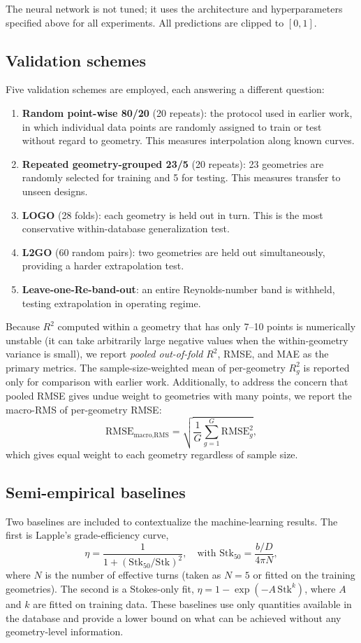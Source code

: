 \documentclass[12pt]{article}
\newcommand{\Stk}{\mathrm{Stk}}
\begin{document}
The neural network is not tuned; it uses the architecture and hyperparameters specified above for all experiments. All predictions are clipped to $[0, 1]$.

\subsection{Validation schemes}
Five validation schemes are employed, each answering a different question:
\begin{enumerate}[label=(\alph*)]
\item \textbf{Random point-wise 80/20} (20 repeats): the protocol used in earlier work, in which individual data points are randomly assigned to train or test without regard to geometry. This measures interpolation along known curves.
\item \textbf{Repeated geometry-grouped 23/5} (20 repeats): 23 geometries are randomly selected for training and 5 for testing. This measures transfer to unseen designs.
\item \textbf{LOGO} (28 folds): each geometry is held out in turn. This is the most conservative within-database generalization test.
\item \textbf{L2GO} (60 random pairs): two geometries are held out simultaneously, providing a harder extrapolation test.
\item \textbf{Leave-one-Re-band-out}: an entire Reynolds-number band is withheld, testing extrapolation in operating regime.
\end{enumerate}
Because $R^2$ computed within a geometry that has only 7--10 points is numerically unstable (it can take arbitrarily large negative values when the within-geometry variance is small), we report \emph{pooled out-of-fold} $R^2$, RMSE, and MAE as the primary metrics. The sample-size-weighted mean of per-geometry $R^2_g$ is reported only for comparison with earlier work. Additionally, to address the concern that pooled RMSE gives undue weight to geometries with many points, we report the macro-RMS of per-geometry RMSE:
\begin{equation}
\text{RMSE}_{\text{macro,RMS}} = \sqrt{\frac{1}{G}\sum_{g=1}^{G} \text{RMSE}_g^2},
\end{equation}
which gives equal weight to each geometry regardless of sample size.

\subsection{Semi-empirical baselines}
Two baselines are included to contextualize the machine-learning results. The first is Lapple's grade-efficiency curve,
\begin{equation}
\eta = \frac{1}{1 + (\Stk_{50}/\Stk)^2}, \quad \text{with } \Stk_{50} = \frac{b/D}{4\pi N},
\end{equation}
where $N$ is the number of effective turns (taken as $N=5$ or fitted on the training geometries). The second is a Stokes-only fit, $\eta = 1 - \exp(-A\,\Stk^{k})$, where $A$ and $k$ are fitted on training data. These baselines use only quantities available in the database and provide a lower bound on what can be achieved without any geometry-level information.
\end{document}
